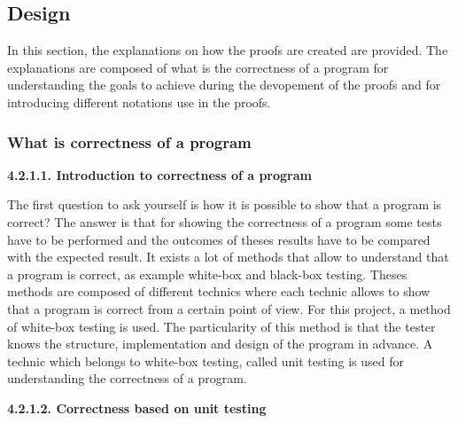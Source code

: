 \documentclass[conference,compsoc]{IEEEtran}
\begin{document}
\subsection{Design}
In this section, the explanations on how the proofs are created are provided. The explanations are composed of what is the correctness of a program for understanding the goals to achieve during the devopement of the proofs and for introducing different notations use in the proofs. 
\newline\newline

\subsubsection{What is correctness of a program}
\noindent
\newline\newline  
\textbf{4.2.1.1. Introduction to correctness of a program}
\newline

The first question to ask yourself is how it is possible to show that a program is correct? The answer is that for showing the correctness of a program some tests have to be performed and the outcomes of theses results have to be compared with the expected result. 
\newline
It exists a lot of methods that allow to understand that a program is correct, as example white-box and black-box testing. Theses methods are composed of different technics where each technic allows to show that a program is correct from a certain point of view. For this project, a method of white-box testing is used. 
\newline
The particularity of this method is that the tester knows the structure, implementation and design of the program in advance. A technic which belongs to white-box testing, called unit testing is used for understanding the correctness of a program.          

\noindent
\newline\newline  
\textbf{4.2.1.2. Correctness based on unit testing}
\newline
\end{document}
